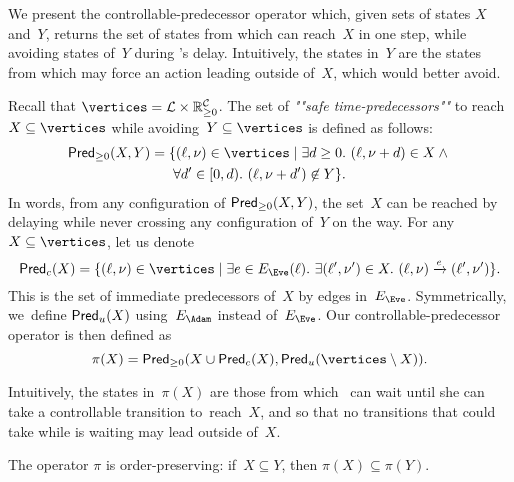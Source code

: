 We present the controllable-predecessor operator which, given sets of
states $X$ and~$Y$, returns the set of states from which \Eve can
reach~$X$ in one step, while avoiding states of~$Y$ during \Eve's
delay. Intuitively, the states in~$Y$ are the states from which \Adam
may force an action leading outside of~$X$, which \Eve would better avoid.

Recall that $\vertices = \Locs \times \Realnn^\Clocks$.
The set of \emph{""safe time-predecessors""} to reach~$X \subseteq \vertices$ while
avoiding~$Y \subseteq \vertices$
is defined as follows:
\begin{multline*}
\predt(X,Y) = \{(\ell,\nu) \in \vertices \mid \exists d\geq
    0.\ (\ell,\nu+d) \in X \wedge{} \\
    \forall d' \in[0,d).\ (\ell,\nu+d') \not  \in Y\}.
\end{multline*}
In words, from any configuration of $\textrm{\sf Pred}_{\geq 0}(X,Y)$,
the set~$X$ can be reached by
delaying while never crossing any configuration of~$Y$ on the way. 
For any $X \subseteq \vertices$, let us denote
\[
  \predc(X) = \{ (\ell,\nu) \in \vertices \mid \exists e \in \EE(\ell).\ 
\exists (\ell',\nu') \in X.\ (\ell,\nu) \xrightarrow{e} (\ell',\nu')\}.
\]
This is the set of immediate predecessors of~$X$ by edges in~$\EE$.
Symmetrically, we~define $\textrm{\sf Pred}_u(X)$ using~$\EA$ instead of~$\EE$.
Our controllable-predecessor operator is then defined as 
%
\[
  \pi(X) = \predt(X\cup \predc(X), \predu(\vertices \setminus X)).
\]

Intuitively, the states in~$\pi(X)$ are those from which \Eve~can wait
until she
can take a controllable transition to~reach~$X$, and so that
no transitions that \Adam could take while \Eve is waiting may lead
outside of~$X$.

\begin{lemma}\label{9-lem:pimonotonic}
  The operator $\pi$ is %
  order-preserving: if~$X\subseteq Y$, then
  $\pi(X) \subseteq \pi(Y)$.  %
\end{lemma}

